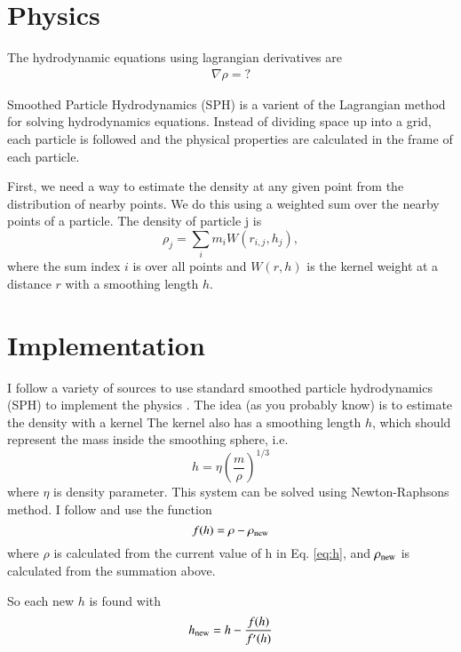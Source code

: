 \documentclass[12pt]{article}
\begin{document}
\section{Physics}
The hydrodynamic equations using lagrangian derivatives are
\begin{align}
    \nabla \rho = ?
\end{align}

Smoothed Particle Hydrodynamics (SPH) is a varient of the Lagrangian method for solving
hydrodynamics equations. Instead of dividing space up into a grid, each particle is followed and the physical properties are calculated in the frame of each particle.

First, we need a way to estimate the density at any given point from the distribution of nearby points. We do this using a weighted sum over the nearby points of a particle. The density of particle j is
\begin{equation}
    \rho_j = \sum_{i} m_i W(r_{i,j}, h_j),
\end{equation}
where the sum index $i$ is over all points and $W(r, h)$ is the kernel weight at a distance $r$ with a smoothing length $h$. 


\section{Implementation}
I follow a variety of sources to use standard smoothed particle hydrodynamics (SPH) to implement the physics \citep{monaghan92,monaghan05,PM07,phantom,dwarf,price12,gadget}.
The idea (as you probably know) is to estimate the density with a kernel
The kernel also has a smoothing length $h$, which should represent the mass inside the smoothing sphere, i.e.
\begin{equation} \label{eq:h}
    h = \eta\left(\frac{m}{\rho}\right)^{1/3}
\end{equation}
where $\eta$ is  density parameter. This system can be solved using Newton-Raphsons method. I follow \citet{monaghan05} and use the function 
\begin{equation}
    f(h) = \rho - \rho_{\rm new}
\end{equation}
where $\rho$ is calculated from the current value of h in Eq. \ref{eq:h}, and $\rho_{\rm new}$ is calculated from the summation above.

So each new $h$ is found with
\begin{equation}
    h_{\rm new} = h - \frac{f(h)}{f'(h)}
\end{equation}
\end{document}
